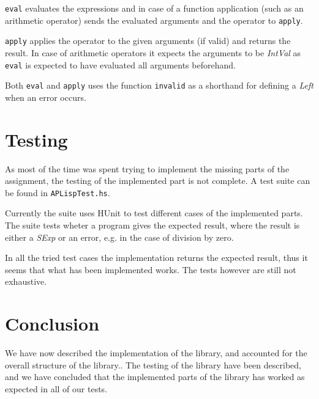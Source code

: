 \documentclass[a4paper, 11pt]{article}
\begin{document}
\texttt{eval} evaluates the expressions and in case of a function application (such as an arithmetic operator) sends the evaluated arguments and the operator to \texttt{apply}.

\texttt{apply} applies the operator to the given arguments (if valid) and returns the result. In case of arithmetic operators it expects the arguments to be \emph{IntVal} as \texttt{eval} is expected to have evaluated all arguments beforehand.

Both \texttt{eval} and \texttt{apply} uses the function \texttt{invalid} as a shorthand for defining a \emph{Left} when an error occurs.



\section{Testing} %
\label{sec:testing}

As most of the time was spent trying to implement the missing parts of the assignment, the testing of the implemented part is not complete. A test suite can be found in \texttt{APLispTest.hs}.

Currently the suite uses HUnit to test different cases of the implemented parts. The suite tests wheter a program gives the expected result, where the result is either a \emph{SExp} or an error, e.g. in the case of division by zero.

In all the tried test cases the implementation returns the expected result, thus it seems that what has been implemented works. The tests however are still not exhaustive.


\section{Conclusion} %
\label{sec:conclusion}

We have now described the implementation of the library, and accounted for the overall structure of the library.. The testing of the library have been described, and we have concluded that the implemented parts of the library has worked as expected in all of our tests.

\end{document}

